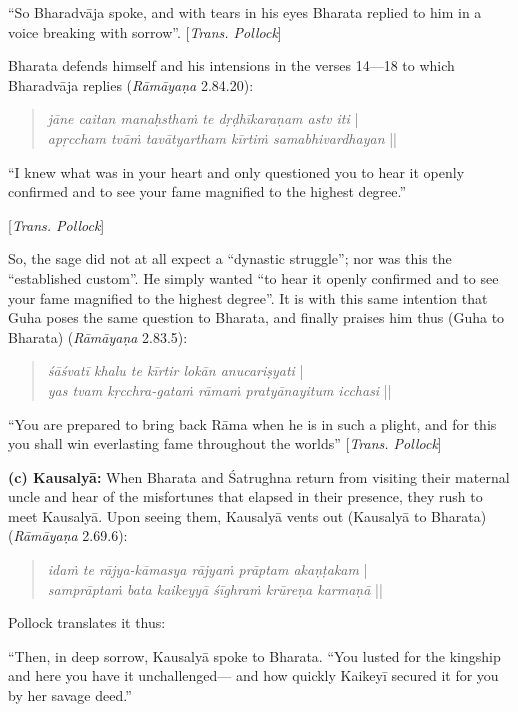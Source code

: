 “So Bharadvāja spoke, and with tears in his eyes Bharata replied to him in a voice breaking with sorrow”. [{\sl Trans. Pollock}]  

Bharata defends himself and his intensions in the verses 14---18 to which Bharadvāja replies ({\sl Rāmāyaṇa} 2.84.20):
\begin{quote}
{{\sl jāne caitan manaḥsthaṁ te dṛḍhīkaraṇam astv iti}} |\\
{\sl apṛccham tvāṁ tavātyartham kīrtiṁ samabhivardhayan} || 
\end{quote}

\begin{myquote}
“I knew what was in your heart and only questioned you to hear it openly confirmed and to see your fame magnified to the highest degree.” 

\hfill[{\sl Trans. Pollock}]
\end{myquote}

So, the sage did not at all expect a “dynastic struggle”; nor was this the “established custom”. He simply wanted “to hear it openly confirmed and to see your fame magnified to the highest degree”. It is with this same intention that Guha poses the same question to Bharata, and finally praises him thus (Guha to Bharata) ({\sl Rāmāyaṇa} 2.83.5): 
\begin{quote}
{{\sl śāśvatī khalu te kīrtir lokān anucariṣyati}} |\\
{\sl yas tvam kṛcchra-gataṁ rāmaṁ pratyānayitum icchasi} || 
\end{quote}

\begin{myquote}
“You are prepared to bring back Rāma when he is in such a plight, and for this you shall win everlasting fame throughout the worlds” [{\sl Trans. Pollock}]
\end{myquote}

\noindent
\textbf{(c) Kausalyā:}  When Bharata and Śatrughna return from visiting their maternal uncle and hear of the misfortunes that elapsed in their presence, they rush to meet Kausalyā. Upon seeing them, Kausalyā vents out (Kausalyā to Bharata) ({\sl Rāmāyaṇa} 2.69.6): 
\begin{quote}
{{\sl idaṁ te rājya-kāmasya rājyaṁ prāptam akaṇṭakam}} |\\
{\sl samprāptaṁ bata kaikeyyā śīghraṁ krūreṇa karmaṇā} || 
\end{quote}

Pollock translates it thus:

\begin{myquote}
“Then, in deep sorrow, Kausalyā spoke to Bharata. “You lusted for the kingship and here you have it unchallenged--- and how quickly Kaikeyī secured it for you by her savage deed.”
\end{myquote}

